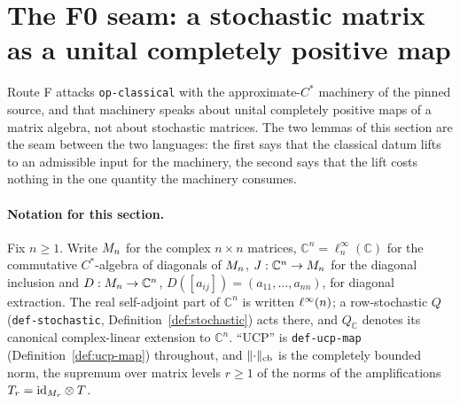 \section{The F0 seam: a stochastic matrix as a unital completely positive map}\label{sec:routef-f0-seam}

Route F attacks \texttt{op-classical} with the approximate-$C^{*}$ machinery of the pinned
source, and that machinery speaks about unital completely positive maps of a matrix algebra,
not about stochastic matrices. The two lemmas of this section are the seam between the two
languages: the first says that the classical datum lifts to an admissible input for the
machinery, the second says that the lift costs nothing in the one quantity the machinery
consumes.

\paragraph{Notation for this section.} Fix $n\ge1$. Write $M_{n}$ for the complex
$n\times n$ matrices, $\mathbb C^{n}=\ell^{\infty}_{n}(\mathbb C)$ for the commutative
$C^{*}$-algebra of diagonals of $M_{n}$, $J:\mathbb C^{n}\to M_{n}$ for the diagonal
inclusion and $D:M_{n}\to\mathbb C^{n}$, $D([a_{ij}])=(a_{11},\dots,a_{nn})$, for diagonal
extraction. The real self-adjoint part of $\mathbb C^{n}$ is written $\ell^{\infty}(n)$; a
row-stochastic $Q$ (\texttt{def-stochastic}, Definition~\ref{def:stochastic}) acts there,
and $Q_{\mathbb C}$ denotes its canonical complex-linear extension to $\mathbb C^{n}$.
``UCP'' is \texttt{def-ucp-map} (Definition~\ref{def:ucp-map}) throughout, and
$\lVert \cdot\rVert_{\mathrm{cb}}$ is the completely bounded norm, the supremum over matrix levels
$r\ge1$ of the norms of the amplifications $T_{r}=\mathrm{id}_{M_{r}}\otimes T$.

